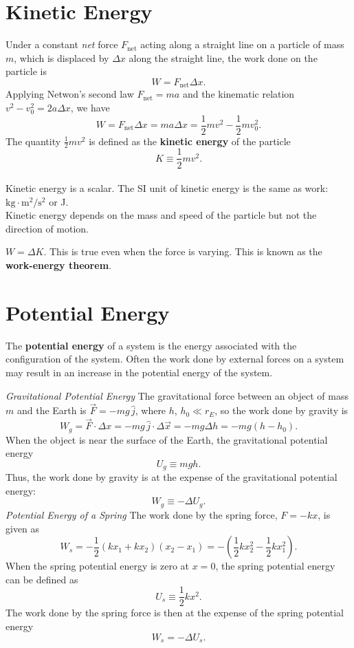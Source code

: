 \documentclass[11pt,letter]{report}
\begin{document}
\section{Kinetic Energy}
Under a constant \textit{net} force $F_\mathrm{net}$ acting along a straight line on a particle of mass $m$, which is displaced by $\Delta{x}$ along the straight line, the work done on the particle is $$W = F_\mathrm{net} \Delta{x}.$$
Applying Netwon's second law $F_\mathrm{net} = ma$ and the kinematic relation $v^2 - v_0^2 = 2a \Delta{x}$, we have $$W = F_\mathrm{net} \Delta{x} = ma \Delta{x} = \frac{1}{2} mv^2 - \frac{1}{2} mv_0^2.$$
The quantity $\frac{1}{2} mv^2$ is defined as the \textbf{kinetic energy} of the particle $$K \equiv \frac{1}{2} mv^2.$$
\\Kinetic energy is a scalar. The SI unit of kinetic energy is the same as work: $\mathrm{kg} \cdot \mathrm{m}^2 / \mathrm{s}^2$ or J.
\\Kinetic energy depends on the mass and speed of the particle but not the direction of motion.

\smallskip

\noindent
$W = \Delta{K}$. This is true even when the force is varying. This is known as the \textbf{work-energy theorem}.

\section{Potential Energy}
The \textbf{potential energy} of a system is the energy associated with the configuration of the system. Often the work done by external forces on a system may result in an increase in the potential energy of the system.

\smallskip

\noindent
\textit{Gravitational Potential Energy} The gravitational force between an object of mass $m$ and the Earth is $\vec{F} = -mg\,\hat{j}$, where $h$, $h_0 \ll r_E$, so the work done by gravity is $$W_g = \vec{F} \cdot \Delta{x} = -mg\,\hat{j} \cdot \Delta{\vec{x}} = -mg \Delta{h} = -mg \left(h - h_0\right).$$
When the object is near the surface of the Earth, the gravitational potential energy $$U_g \equiv mgh.$$
Thus, the work done by gravity is at the expense of the gravitational potential energy: $$W_g \equiv -\Delta{U_g}.$$
\textit{Potential Energy of a Spring} The work done by the spring force, $F = -kx$, is given as $$W_s = -\frac{1}{2} \left(kx_1 + kx_2\right)\left(x_2 - x_1\right) = -\left(\frac{1}{2} kx_2^2 - \frac{1}{2} kx_1^2\right).$$
When the spring potential energy is zero at $x = 0$, the spring potential energy can be defined as $$U_s \equiv \frac{1}{2} kx^2.$$
The work done by the spring force is then at the expense of the spring potential energy $$W_s = -\Delta{U_s}.$$
\end{document}
